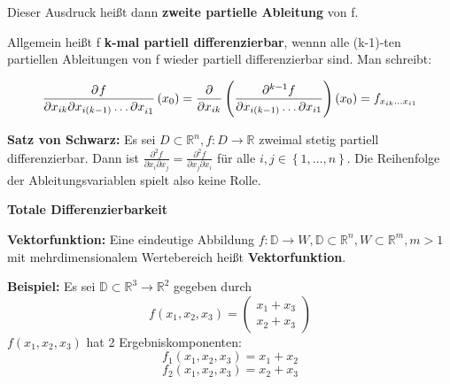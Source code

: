 \documentclass[fontset=ubuntu,12pt,a4paper,fleqn]{article}
\begin{document}
Dieser Ausdruck heißt dann \textbf{zweite partielle Ableitung} von f.

Allgemein heißt f \textbf{k-mal partiell differenzierbar}, wennn alle (k-1)-ten partiellen Ableitungen von f wieder partiell differenzierbar sind. Man schreibt:

\[\dpd{f}{x_{ik} \partial x_{i(k-1)} \dots \partial x_{i1}}(x_0) = \frac{\partial}{\partial x_{ik}}\left(\frac{\partial^{k-1} f}{\partial x_{i(k-1)} \dots \partial x_{i1}}\right)(x_0)=f_{x_{ik} \dots x_{i1}}\]

\textbf{Satz von Schwarz:}
Es sei \(D\subset\mathbb{R}^n,f:D\to\mathbb{R}\) zweimal stetig partiell differenzierbar. Dann ist \(\frac{\partial^2 f}{\partial x_i \partial x_j}=\frac{\partial^2 f}{\partial x_j \partial x_i}\) für alle \(i,j\in\left\{1,\dots,n\right\}\). Die Reihenfolge der Ableitungsvariablen spielt also keine Rolle.
\newpage








{\Large\textbf{Totale Differenzierbarkeit}\par}
\textbf{Vektorfunktion:}
Eine eindeutige Abbildung \(f:\mathbb{D}\to W,\mathbb{D}\subset\mathbb{R}^n,W\subset\mathbb{R}^m,m>1\) mit mehrdimensionalem Wertebereich heißt \textbf{Vektorfunktion}.
     
\begin{multicols}{2}
\textbf{Beispiel:}
Es sei \(\mathbb{D}\subset\mathbb{R}^3\to\mathbb{R}^2\) gegeben durch
\[f(x_1,x_2,x_3)=\begin{pmatrix}
x_1+x_3 \\ x_2+x_3
\end{pmatrix}\]
$f(x_1,x_2,x_3)$ hat 2 Ergebniskomponenten:
\[f_1(x_1,x_2,x_3)=x_1+x_2\]
\[f_2(x_1,x_2,x_3)=x_2+x_3\]
\end{multicols}
\end{document}
